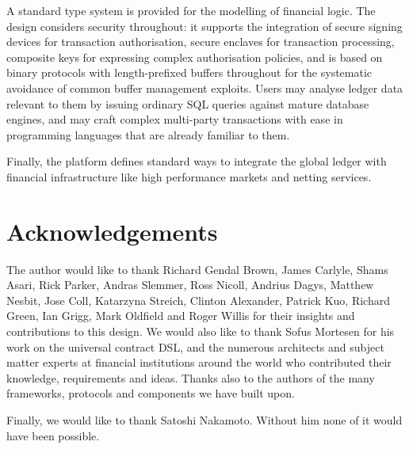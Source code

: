 \documentclass{article}
\begin{document}
A standard type system is provided for the modelling of financial logic. The design considers security throughout:
it supports the integration of secure signing devices for transaction authorisation, secure enclaves for
transaction processing, composite keys for expressing complex authorisation policies, and is based on binary
protocols with length-prefixed buffers throughout for the systematic avoidance of common buffer management
exploits. Users may analyse ledger data relevant to them by issuing ordinary SQL queries against mature database
engines, and may craft complex multi-party transactions with ease in programming languages that are already
familiar to them.

Finally, the platform defines standard ways to integrate the global ledger with financial infrastructure like high
performance markets and netting services.

\section{Acknowledgements}

The author would like to thank Richard Gendal Brown, James Carlyle, Shams Asari, Rick Parker, Andras Slemmer, Ross
Nicoll, Andrius Dagys, Matthew Nesbit, Jose Coll, Katarzyna Streich, Clinton Alexander, Patrick Kuo, Richard Green,
Ian Grigg, Mark Oldfield and Roger Willis for their insights and contributions to this design. We would also like
to thank Sofus Mortesen for his work on the universal contract DSL, and the numerous architects and subject matter
experts at financial institutions around the world who contributed their knowledge, requirements and ideas. Thanks
also to the authors of the many frameworks, protocols and components we have built upon.

Finally, we would like to thank Satoshi Nakamoto. Without him none of it would have been possible.



\end{document}
